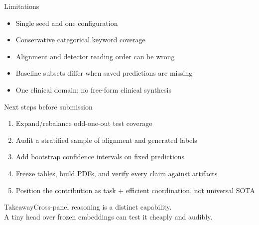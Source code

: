 \documentclass[aspectratio=169]{beamer}
\begin{document}
\begin{frame}{Limitations}\begin{itemize}\item Single seed and one configuration\item Conservative categorical keyword coverage\item Alignment and detector reading order can be wrong\item Baseline subsets differ when saved predictions are missing\item One clinical domain; no free-form clinical synthesis\end{itemize}\end{frame}
\begin{frame}{Next steps before submission}\begin{enumerate}\item Expand/rebalance odd-one-out test coverage\item Audit a stratified sample of alignment and generated labels\item Add bootstrap confidence intervals on fixed predictions\item Freeze tables, build PDFs, and verify every claim against artifacts\item Position the contribution as task + efficient coordination, not universal SOTA\end{enumerate}\end{frame}
\begin{frame}{Takeaway}\centering\Large Cross-panel reasoning is a distinct capability.\\[1em]\normalsize A tiny head over frozen embeddings can test it cheaply and audibly.\end{frame}
\end{document}
